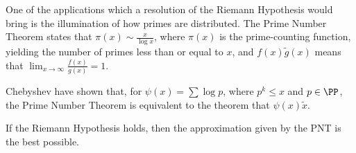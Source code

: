 \documentclass[11pt]{scrartcl}
\begin{document}
  One of the applications which a resolution of the Riemann Hypothesis
  would bring is the illumination of how primes are distributed. The
  Prime Number Theorem states that $\pi(x) \sim \frac{x}{\log x}$,
  where $\pi(x)$ is the prime-counting function, yielding the number
  of primes less than or equal to $x$, and $f(x) \tilde g(x)$ means
  that $\lim_{x \to \infty} \frac{f(x)}{g(x)} = 1$.

  Chebyshev have shown that, for $\psi(x) = \sum \log p$, where
  $p^{k} \leq x$ and $p\in \PP$, the Prime Number Theorem is
  equivalent to the theorem that $\psi(x) \tilde x$.

  If the Riemann Hypothesis holds, then the approximation given by the
  PNT is the best possible.
\end{document}
